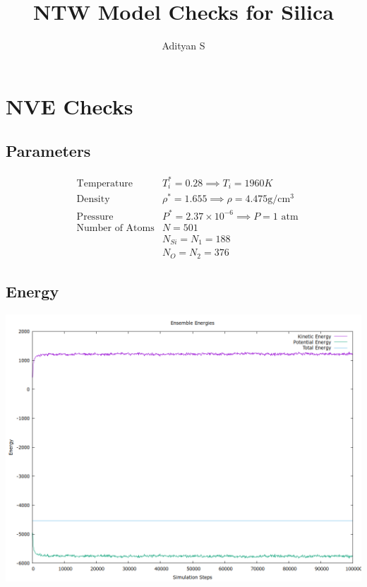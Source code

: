 \documentclass[a4paper,11pt,twoside]{article}
\author{Adityan S}
\date{}
\title{NTW Model Checks for Silica}
\begin{document}
\maketitle
\tableofcontents

\section{NVE Checks}
\label{sec:orga129dc3}
\subsection{Parameters}
\label{sec:org7ea07d7}
\begin{align*}
      & \mathrm{Temperature} & T^*_{i} = 0.28  \implies T_i = 1960K  \\
      & \mathrm{Density} & \rho^* = 1.655 \implies \rho = 4.475\mathrm{ g/cm^{3}} \\
      & \mathrm{Pressure} & P^* = 2.37 \times 10^{-6} \implies P = 1 \mathrm{\text{ atm}} \\
      & \mathrm{\text{Number of Atoms}} & N = 501 \\
      & & N_{Si} = N_1 = 188 \\
      & & N_{O }= N_2 = 376
\end{align*}
\subsection{Energy}
\label{sec:org7858087}
\begin{center}
\includegraphics[width=.9\linewidth]{../../runs/nve_lammps_pair_style/plots/energy.png}
\end{center}
\end{document}
